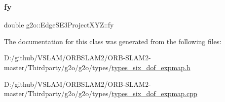 \subsubsection{\texorpdfstring{fy}{fy}}
{\footnotesize\ttfamily double g2o\+::\+Edge\+S\+E3\+Project\+X\+Y\+Z\+::fy}



The documentation for this class was generated from the following files\+:\begin{DoxyCompactItemize}
\item 
D\+:/github/\+V\+S\+L\+A\+M/\+O\+R\+B\+S\+L\+A\+M2/\+O\+R\+B-\/\+S\+L\+A\+M2-\/master/\+Thirdparty/g2o/g2o/types/\mbox{\hyperlink{types__six__dof__expmap_8h}{types\+\_\+six\+\_\+dof\+\_\+expmap.\+h}}\item 
D\+:/github/\+V\+S\+L\+A\+M/\+O\+R\+B\+S\+L\+A\+M2/\+O\+R\+B-\/\+S\+L\+A\+M2-\/master/\+Thirdparty/g2o/g2o/types/\mbox{\hyperlink{types__six__dof__expmap_8cpp}{types\+\_\+six\+\_\+dof\+\_\+expmap.\+cpp}}\end{DoxyCompactItemize}
